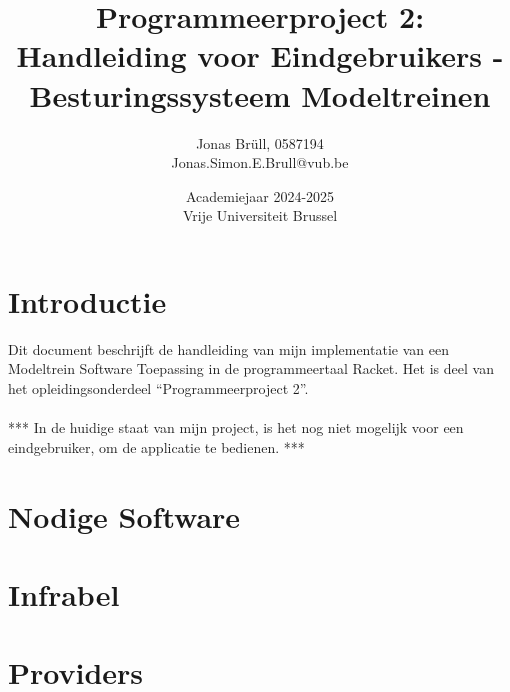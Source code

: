 \documentclass[a4paper, 11pt]{article}
\title{Programmeerproject 2:\\ Handleiding voor Eindgebruikers - Besturingssysteem Modeltreinen}
\author{Jonas Br\"ull, 0587194\\ Jonas.Simon.E.Brull@vub.be\\}
\date{Academiejaar 2024-2025\\Vrije Universiteit Brussel}
\newcommand{\<}{\scriptsize\textless\normalsize}
\renewcommand{\>}{\scriptsize\textgreater\normalsize}
\begin{document}
\maketitle
\newpage

\tableofcontents
\newpage

\pagestyle{fancy}
\setcounter{page}{1}

\section{Introductie} %
Dit document beschrijft de handleiding van mijn implementatie van een Modeltrein Software Toepassing in de programmeertaal Racket. Het is deel van het opleidingsonderdeel ``Programmeerproject 2''.\\\\
*** In de huidige staat van mijn project, is het nog niet mogelijk voor een eindgebruiker, om de applicatie te bedienen. ***

\newpage
\section{Nodige Software} %

\newpage
\section{Infrabel} %

\newpage
\section{Providers} %

\label{lastpage}
\end{document}
